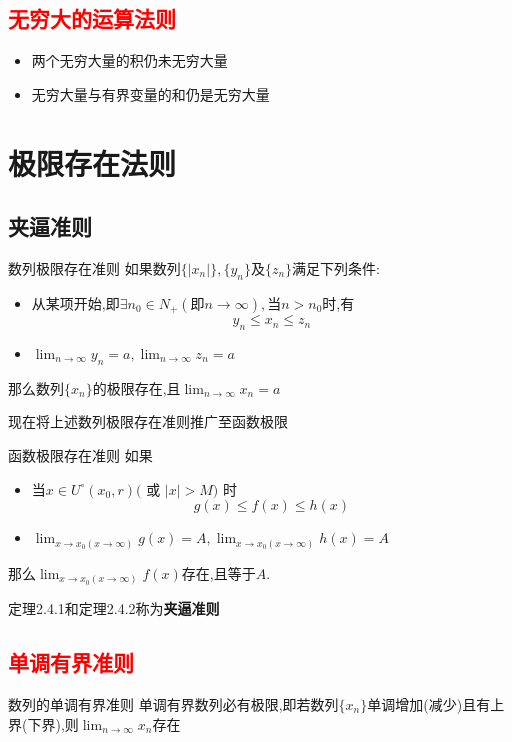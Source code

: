 \documentclass[12pt, a4paper, oneside, UTF8]{ctexbook}  %
\begin{document}
\subsection{\textcolor{red}{无穷大的运算法则}}
\begin{itemize}
    \item 两个无穷大量的积仍未无穷大量
    \item 无穷大量与有界变量的和仍是无穷大量
\end{itemize}

\section{极限存在法则}

\subsection{夹逼准则}
\begin{them}{数列极限存在准则}{}
    如果数列$\{|x_n|\},\{y_n\}$及$\{z_n\}$满足下列条件:
    \begin{itemize}
        \item 从某项开始,即$\exists n_0 \in N_+(\text{即}n \to \infty),$当$n>n_0$时,有
              $$
                  y_n \leqslant x_n \leqslant z_n
              $$
        \item $\lim_{n\to\infty}y_{n}=a,\operatorname*{lim}_{n\to\infty}z_{n}=a$
    \end{itemize}
    那么数列$\{ x_n \}$的极限存在,且$\lim_{n\to\infty}x_{n}=a$
\end{them}
现在将上述数列极限存在准则推广至函数极限
\begin{them}{函数极限存在准则}{}
    如果
    \begin{itemize}
        \item 当$x\in U^{\circ}(x_{0},r)($ 或 $|x|>M)$ 时
              $$
                  g(x)\leqslant f(x) \leqslant h(x)
              $$
        \item $\lim_{x\to x_0(x\to\infty)}g(x)=A,\lim_{x\to x_0(x\to\infty)}h(x)=A$
    \end{itemize}
    那么$\lim_{x\to x_0(x\to\infty)}f(x)$存在,且等于$A$.
\end{them}
定理2.4.1和定理2.4.2称为\textbf{夹逼准则}
\subsection{\textcolor{red}{单调有界准则}}
\begin{them}{数列的单调有界准则}{}
    单调有界数列必有极限,即若数列$\{x_n\}$单调增加(减少)且有上界(下界),则$\lim_{n \to \infty} x_n$存在
\end{them}
\end{document}
